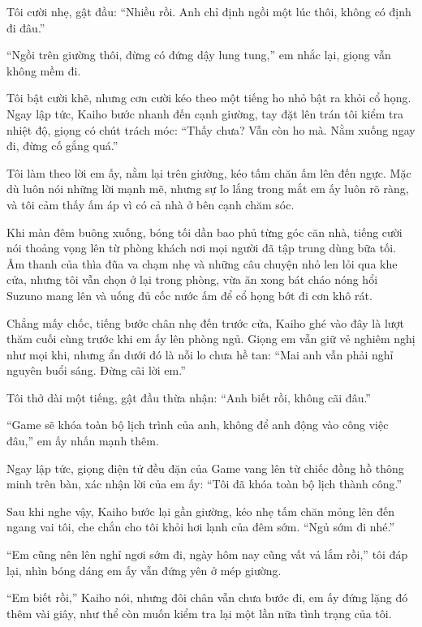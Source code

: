 \documentclass[../main.tex]{subfiles}
\begin{document}
Tôi cười nhẹ, gật đầu: ``Nhiều rồi. Anh chỉ định ngồi một lúc thôi, không có định đi đâu.''

``Ngồi trên giường thôi, đừng có đứng dậy lung tung,'' em nhắc lại, giọng vẫn không mềm đi.

Tôi bật cười khẽ, nhưng cơn cười kéo theo một tiếng ho nhỏ bật ra khỏi cổ họng. Ngay lập tức, Kaiho bước nhanh đến cạnh giường, tay đặt lên trán tôi kiểm tra nhiệt độ, giọng có chút trách móc: ``Thấy chưa? Vẫn còn ho mà. Nằm xuống ngay đi, đừng cố gắng quá.''

Tôi làm theo lời em ấy, nằm lại trên giường, kéo tấm chăn ấm lên đến ngực. Mặc dù luôn nói những lời mạnh mẽ, nhưng sự lo lắng trong mắt em ấy luôn rõ ràng, và tôi cảm thấy ấm áp vì có cả nhà ở bên cạnh chăm sóc.

\ct

Khi màn đêm buông xuống, bóng tối dần bao phủ từng góc căn nhà, tiếng cười nói thoảng vọng lên từ phòng khách nơi mọi người đã tập trung dùng bữa tối. Âm thanh của thìa đũa va chạm nhẹ và những câu chuyện nhỏ len lỏi qua khe cửa, nhưng tôi vẫn chọn ở lại trong phòng, vừa ăn xong bát cháo nóng hổi Suzuno mang lên và uống đủ cốc nước ấm để cổ họng bớt đi cơn khô rát.

Chẳng mấy chốc, tiếng bước chân nhẹ đến trước cửa, Kaiho ghé vào đây là lượt thăm cuối cùng trước khi em ấy lên phòng ngủ. Giọng em vẫn giữ vẻ nghiêm nghị như mọi khi, nhưng ẩn dưới đó là nỗi lo chưa hề tan: ``Mai anh vẫn phải nghỉ nguyên buổi sáng. Đừng cãi lời em.''

Tôi thở dài một tiếng, gật đầu thừa nhận: ``Anh biết rồi, không cãi đâu.''

``Game sẽ khóa toàn bộ lịch trình của anh, không để anh động vào công việc đâu,'' em ấy nhấn mạnh thêm.

Ngay lập tức, giọng điện tử đều đặn của Game vang lên từ chiếc đồng hồ thông minh trên bàn, xác nhận lời của em ấy: ``Tôi đã khóa toàn bộ lịch thành công.''

Sau khi nghe vậy, Kaiho bước lại gần giường, kéo nhẹ tấm chăn mỏng lên đến ngang vai tôi, che chắn cho tôi khỏi hơi lạnh của đêm sớm. ``Ngủ sớm đi nhé.''

``Em cũng nên lên nghỉ ngơi sớm đi, ngày hôm nay cũng vất vả lắm rồi,'' tôi đáp lại, nhìn bóng dáng em ấy vẫn đứng yên ở mép giường.

``Em biết rồi,'' Kaiho nói, nhưng đôi chân vẫn chưa bước đi, em ấy đứng lặng đó thêm vài giây, như thể còn muốn kiểm tra lại một lần nữa tình trạng của tôi.
\end{document}
